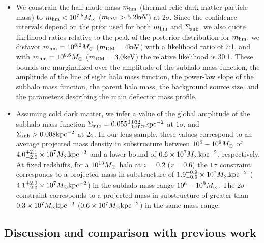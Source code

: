 \begin{itemize}
	\item We constrain the half-mode mass ${m_{\rm{hm}}}$ (thermal relic dark matter particle mass) to ${m_{\rm{hm}}} < 10^{7.8} {M_{\odot}}$ ($m_{\rm{DM}} > 5.2 \rm{keV}$) at 2$\sigma$. Since the confidence intervals depend on the prior used for both ${m_{\rm{hm}}}$ and $\Sigma_{\rm{sub}}$, we also quote likelihood ratios relative to the peak of the posterior distribution for ${m_{\rm{hm}}}$: we disfavor ${m_{\rm{hm}}} = 10^{8.2} {M_{\odot}}$ ($m_{\rm{DM}} = 4 \rm{keV}$) with a likelihood ratio of 7:1, and with ${m_{\rm{hm}}} = 10^{8.6} {M_{\odot}}$ ($m_{\rm{DM}} = 3.0 \rm{keV}$) the relative likelihood is 30:1. These bounds are marginalized over the amplitude of the subhalo mass function, the amplitude of the line of sight halo mass function, the power-law slope of the subhalo mass function, the parent halo mass, the background source size, and the parameters describing the main deflector mass profile.
	\item Assuming cold dark matter, we infer a value of the global amplitude of the subhalo mass function $\Sigma_{\rm{sub}} = 0.055_{-0.027}^{0.032} \rm{kpc^{-2}}$ at $1 \sigma$, and $\Sigma_{\rm{sub}} > 0.008 \rm{kpc^{-2}}$ at $2 \sigma$. In our lens sample, these values correspond to an average projected mass density in substructure between $10^6 - 10^{9} {M_{\odot}}$ of $4.0_{-2.0}^{+2.1} \times 10^{7} {M_{\odot}} \rm{kpc^{-2}}$ and a lower bound of $0.6  \times 10^{7} {M_{\odot}} \rm{kpc^{-2}}$, respectively. At fixed redshifts, for a $10^{13} {M_{\odot}}$ halo at $z=0.2$ ($z=0.6$) the $1 \sigma$ constraint corresponds to a projected mass in substructure of $1.9_{-0.9}^{+0.9} \times 10^7 {M_{\odot}} \rm{kpc^{-2}}$ ($4.1_{-2.0}^{+2.0} \times 10^7 {M_{\odot}} \rm{kpc^{-2}}$) in the subhalo mass range $10^6-10^{9} {M_{\odot}}$. The $2 \sigma$ constraint corresponds to a projected mass in substructure of greater than $0.3 \times 10^7 {M_{\odot}} \rm{kpc^{-2}}$ ($0.6 \times 10^7 {M_{\odot}} \rm{kpc^{-2}}$) in the same mass range.
	
\end{itemize}

\subsection{Discussion and comparison with previous work}
\label{ssec:comparison}

